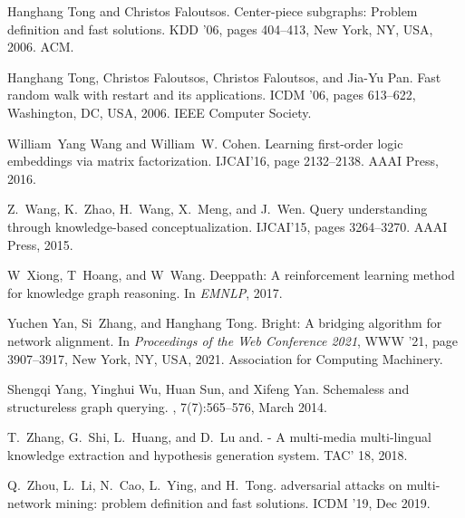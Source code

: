 \documentclass[11pt]{article}
\begin{document}
\begin{thebibliography}{10}
Hanghang Tong and Christos Faloutsos.
\newblock Center-piece subgraphs: Problem definition and fast solutions.
\newblock KDD '06, pages 404--413, New York, NY, USA, 2006. ACM.

Hanghang Tong, Christos Faloutsos, Christos Faloutsos, and Jia-Yu Pan.
\newblock Fast random walk with restart and its applications.
\newblock ICDM '06, pages 613--622, Washington, DC, USA, 2006. IEEE Computer
  Society.

William~Yang Wang and William~W. Cohen.
\newblock Learning first-order logic embeddings via matrix factorization.
\newblock IJCAI’16, page 2132–2138. AAAI Press, 2016.

Z.~Wang, K.~Zhao, H.~Wang, X.~Meng, and J.~Wen.
\newblock Query understanding through knowledge-based conceptualization.
\newblock IJCAI'15, pages 3264--3270. AAAI Press, 2015.

W~Xiong, T~Hoang, and W~Wang.
\newblock Deeppath: A reinforcement learning method for knowledge graph
  reasoning.
\newblock In {\em EMNLP}, 2017.

Yuchen Yan, Si~Zhang, and Hanghang Tong.
\newblock Bright: A bridging algorithm for network alignment.
\newblock In {\em Proceedings of the Web Conference 2021}, WWW '21, page
  3907–3917, New York, NY, USA, 2021. Association for Computing Machinery.

Shengqi Yang, Yinghui Wu, Huan Sun, and Xifeng Yan.
\newblock Schemaless and structureless graph querying.
, 7(7):565--576, March 2014.

T.~Zhang, G.~Shi, L.~Huang, and D.~Lu and.
 - {A} multi-media multi-lingual knowledge extraction and
  hypothesis generation system.
\newblock TAC' 18, 2018.

Q.~{Zhou}, L.~{Li}, N.~{Cao}, L.~{Ying}, and H.~{Tong}.
\newblock adversarial attacks on multi-network mining: problem definition and
  fast solutions.
\newblock ICDM '19, Dec 2019.

\end{thebibliography}
\end{document}
